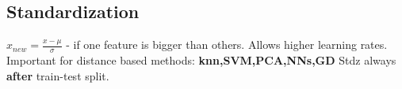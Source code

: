 \subsection{Standardization}

$x_{new} = \frac{x-\mu}{\sigma}$  - if one feature is bigger than others. Allows higher learning rates. Important for distance based methods: \textbf{knn,SVM,PCA,NNs,GD}
Stdz always \textbf{after} train-test split.

